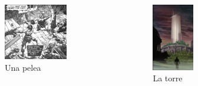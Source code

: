 \begin{frame}{}
\begin{columns}
    \begin{figure}[htb]
    \centering
        \includegraphics[width=0.7\textwidth]{img/res/05}
        \caption{Una pelea}
    \end{figure}
    \begin{figure}[htb]
    \centering
        \includegraphics[width=0.4\textwidth]{img/res/06}
        \caption{La torre}
    \end{figure}
\end{columns}
\end{frame}

